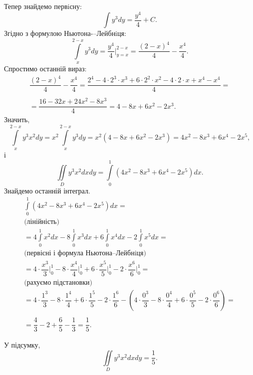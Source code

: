 \begin{example}
Тепер знайдемо первiсну:
\[
\int y^3  d y = \frac{y^4}{4} + C.
\]
Згідно з формулою Ньютона-–Лейбнiця:
\[
\int\limits_{x}^{2 - x} y^3 d y = \frac{y^4}{4}\biggr|_{y=x}^{2-x} = \frac{\left(2 - x\right)^4}{4} - \frac{x^4}{4}.
\]
Спростимо останній вираз:
\[
\begin{array}{c}
\dfrac{\left(2 - x\right)^4}{4} - \dfrac{x^4}{4} = \dfrac{2^4 - 4\cdot 2^3\cdot x^3 + 6\cdot 2^2\cdot x^2 - 4 \cdot 2\cdot x + x^4 - x^4}{4} =\\\\=\dfrac{16 - 32 x + 24 x^2 - 8 x^3}{4}  = 4 - 8 x + 6 x^2 -  2 x^3.
\end{array}
\]
Значить,
\[
\int\limits_{x}^{2 - x} y^3 x^2 d y = x^2 \int\limits_{x}^{2 - x} y^3  d y = x^2\left(4 - 8 x + 6 x^2 -  2 x^3\right) = 4 x^2 - 8 x^3 + 6 x^4 -  2 x^5,
\]
і
\[
\iint\limits_D y^3 x^2 d x d y = \int\limits_0^1 \left(4 x^2 - 8 x^3 + 6 x^4 -  2 x^5\right) d x.
\]
Знайдемо останній інтеграл.
\[
\begin{array}{c}
\int\limits_0^1 \left(4 x^2 - 8 x^3 + 6 x^4 -  2 x^5\right) d x =\\
\mbox{(лінійність)} \\
= 4 \int\limits_0^1 x^2  d x - 8 \int\limits_0^1x^3  d x + 6 \int\limits_0^1x^4  d x -  2 \int\limits_0^1x^5 d x  = \\
\mbox{(первісні і формула Ньютона--Лейбнiця)}\\
=4\cdot\dfrac{x^3}{3}\biggr|_0^1 - 8\cdot \dfrac{x^4}{4}\biggr|_0^1 + 6\cdot\dfrac{x^5}{5}\biggr|_0^1 - 2\cdot\dfrac{x^6}{6}\biggr|_0^1 =\\
\mbox{(рахуємо підстановки)}\\
= 4\cdot\dfrac{1^3}{3} - 8\cdot \dfrac{1^4}{4} + 6\cdot\dfrac{1^5}{5} - 2\cdot\dfrac{1^6}{6} - \left(4\cdot\dfrac{0^3}{3} - 8\cdot \dfrac{0^4}{4} + 6\cdot\dfrac{0^5}{5} - 2\cdot\dfrac{0^6}{6}\right) = \\\\
= \dfrac{4}{3} - 2 + \dfrac{6}{5} - \dfrac{1}{3} = \dfrac{1}{5}.
\end{array}
\]

У підсумку,
\[
\iint\limits_D y^3 x^2 d x d y = \dfrac{1}{5}.
\]
\end{example}

